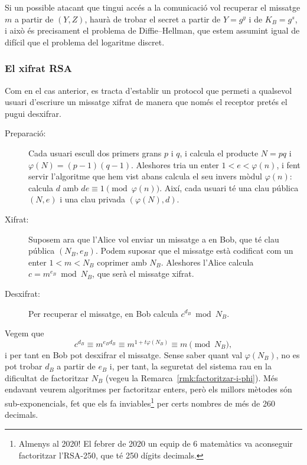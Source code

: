  Si un possible atacant que tingui accés a la comunicació vol recuperar el missatge $m$ a partir de $(Y,Z)$, haurà de trobar el secret a partir de $Y=g^y$ i de $K_B=g^s$, i això és precisament el problema de Diffie--Hellman, que estem assumint igual de difícil que el problema del logaritme discret.

\subsubsection{El xifrat RSA}
Com en el cas anterior, es tracta d'establir un protocol que permeti a qualsevol usuari d'escriure un missatge xifrat de manera que només el receptor pretés el pugui desxifrar.

\begin{description}

\item[Preparació:] Cada usuari escull dos primers grans $p$ i $q$, i calcula el producte $N=pq$ i $\varphi(N)=(p-1)(q-1)$. Aleshores tria un enter $1<e<\varphi(n)$, i fent servir l'algoritme que hem vist abans calcula el seu invers mòdul $\varphi(n)$: calcula $d$ amb $de\equiv 1\pmod{\varphi(n)}$. Així, cada usuari té una clau pública $(N,e)$ i una clau privada $(\varphi(N),d)$.

\item[Xifrat:] Suposem ara que l'Alice vol enviar un missatge a en Bob, que té clau pública $(N_B,e_B)$. Podem suposar que el missatge està codificat com un enter $1<m<N_B$ coprimer amb $N_B$. Aleshores l'Alice calcula $c=m^{e_B}\bmod{N_B}$, que serà el missatge xifrat.

\item[Desxifrat:] Per recuperar el missatge, en Bob calcula $c^{d_B}\bmod{N_B}$.
\end{description}
Vegem que
\[
c^{d_B}\equiv m^{e_Bd_B}\equiv m^{1+t\varphi(N_B)}\equiv m\pmod{N_B},
\]
i per tant en Bob pot desxifrar el missatge. Sense saber quant val $\varphi(N_B)$, no es pot trobar $d_B$ a partir de $e_B$ i, per tant, la seguretat del sistema rau en la dificultat de factoritzar $N_B$ (vegeu la Remarca~\ref{rmk:factoritzar-i-phi}). Més endavant veurem algoritmes per factoritzar enters, però els millors mètodes són sub-exponencials, fet que els fa inviables\footnote{Almenys al 2020! El febrer de 2020 un equip de 6 matemàtics va aconseguir factoritzar l'RSA-250, que té 250 dígits decimals.} per certs nombres de més de 260 decimals.  
